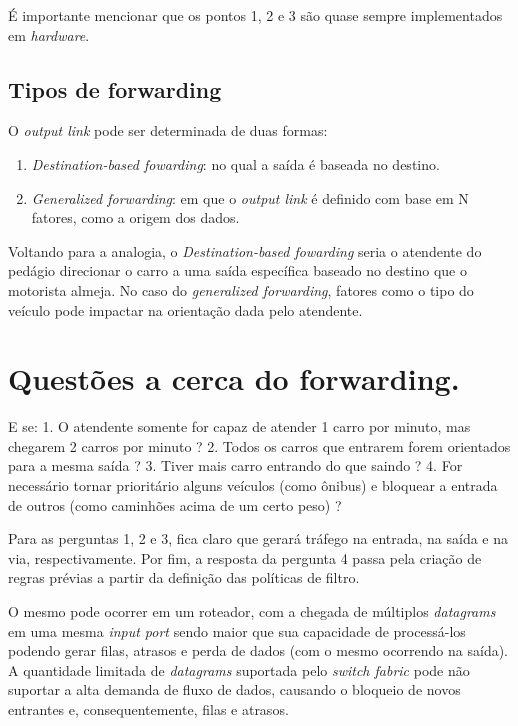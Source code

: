 É importante mencionar que os pontos 1, 2 e 3 são quase sempre
implementados em \emph{hardware}.

\hypertarget{tipos-de-forwarding}{%
\subsection{Tipos de forwarding}\label{tipos-de-forwarding}}

O \emph{output link} pode ser determinada de duas formas:

\begin{enumerate}
\def\labelenumi{\arabic{enumi}.}

\item
  \emph{Destination-based fowarding}: no qual a saída é baseada no
  destino.
\item
  \emph{Generalized forwarding}: em que o \emph{output link} é definido
  com base em N fatores, como a origem dos dados.
\end{enumerate}

Voltando para a analogia, o \emph{Destination-based fowarding} seria o
atendente do pedágio direcionar o carro a uma saída específica baseado
no destino que o motorista almeja. No caso do \emph{generalized
forwarding}, fatores como o tipo do veículo pode impactar na orientação
dada pelo atendente.

\hypertarget{questuxf5es-a-cerca-do-forwarding.}{%
\section{Questões a cerca do forwarding.}\label{questuxf5es-a-cerca-do-forwarding.}}

E se: 1. O atendente somente for capaz de atender 1 carro por minuto,
mas chegarem 2 carros por minuto ? 2. Todos os carros que entrarem forem
orientados para a mesma saída ? 3. Tiver mais carro entrando do que
saindo ? 4. For necessário tornar prioritário alguns veículos (como
ônibus) e bloquear a entrada de outros (como caminhões acima de um certo
peso) ?

Para as perguntas 1, 2 e 3, fica claro que gerará tráfego na entrada, na
saída e na via, respectivamente. Por fim, a resposta da pergunta 4 passa
pela criação de regras prévias a partir da definição das políticas de
filtro.

O mesmo pode ocorrer em um roteador, com a chegada de múltiplos
\emph{datagrams} em uma mesma \emph{input port} sendo maior que sua
capacidade de processá-los podendo gerar filas, atrasos e perda de dados
(com o mesmo ocorrendo na saída). A quantidade limitada de
\emph{datagrams} suportada pelo \emph{switch fabric} pode não suportar a
alta demanda de fluxo de dados, causando o bloqueio de novos entrantes
e, consequentemente, filas e atrasos.

